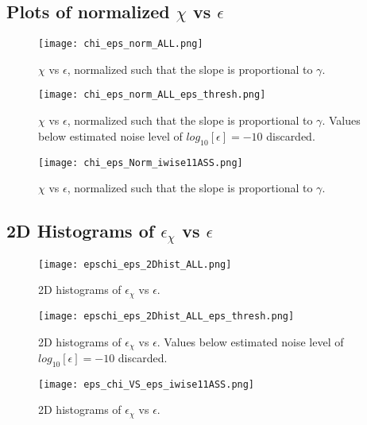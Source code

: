 \documentclass[11pt]{article}
\begin{document}
\clearpage
\subsection{Plots of normalized $\chi$ vs $\epsilon$}

\begin{figure}[htbp]
\texttt{[image: chi\_eps\_norm\_ALL.png]}
\caption{$\chi$ vs $\epsilon$, normalized such that the slope is proportional to $\gamma$.}
\label{}
\end{figure}


\begin{figure}[htbp]
\texttt{[image: chi\_eps\_norm\_ALL\_eps\_thresh.png]}
\caption{$\chi$ vs $\epsilon$, normalized such that the slope is proportional to $\gamma$. Values below estimated noise level of $log_{10}[\epsilon]=-10$ discarded.}
\label{}
\end{figure}


\begin{figure}[htbp]
\texttt{[image: chi\_eps\_Norm\_iwise11ASS.png]}
\caption{$\chi$ vs $\epsilon$, normalized such that the slope is proportional to $\gamma$.}
\label{}
\end{figure}





\clearpage
\subsection{2D Histograms of $\epsilon_{\chi}$ vs $\epsilon$}

\begin{figure}[htbp]
\texttt{[image: epschi\_eps\_2Dhist\_ALL.png]}
\caption{2D histograms of $\epsilon_{\chi}$ vs $\epsilon$.}
\label{}
\end{figure}


\begin{figure}[htbp]
\texttt{[image: epschi\_eps\_2Dhist\_ALL\_eps\_thresh.png]}
\caption{2D histograms of $\epsilon_{\chi}$ vs $\epsilon$. Values below estimated noise level of $log_{10}[\epsilon]=-10$ discarded.}
\label{}
\end{figure}


\begin{figure}[htbp]
\texttt{[image: eps\_chi\_VS\_eps\_iwise11ASS.png]}
\caption{2D histograms of $\epsilon_{\chi}$ vs $\epsilon$.}
\label{}
\end{figure}






\end{document}
